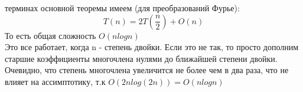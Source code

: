  терминах основной теоремы имеем (для преобразований Фурье):
$$
T(n) = 2T(\frac n 2) + O(n)
$$
То есть общая сложность $O(n log n)$ \\

 Это все работает, когда n - степень двойки. Если это не так, то просто дополним старшие коэффициенты многочлена нулями до ближайшей степени двойки. Очевидно, что степень многочлена увеличится не более чем в два раза, что не влияет на ассимптотику, т.к $O(2 n log(2 n)) = O(n log n)$
